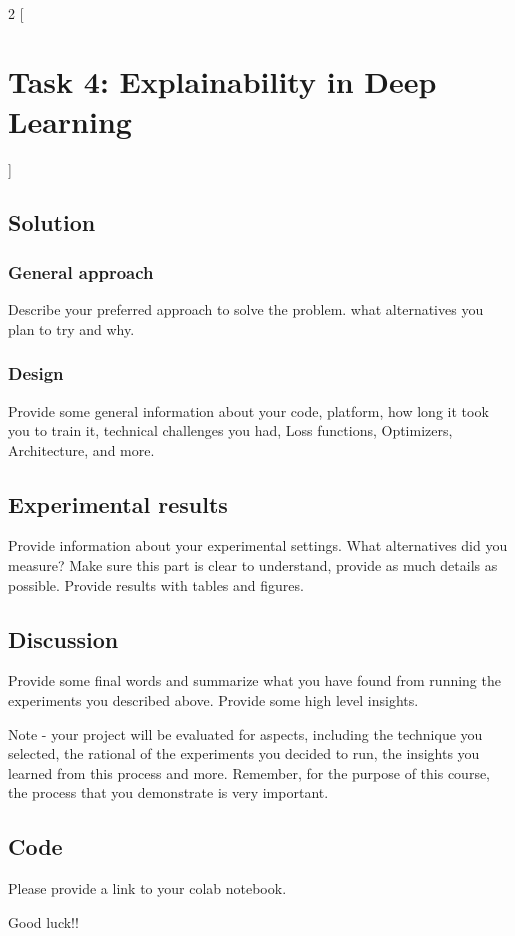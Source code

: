 \documentclass{article}
\begin{document}
\
\begin{multicols}{2}
[
\section{\centering Task 4: Explainability in Deep Learning}
]
\subsection{Solution}
\subsubsection{General approach}
Describe your preferred approach to solve the problem. what alternatives you plan to try and why. 

\subsubsection{Design}
Provide some general information about your code, platform, how long it took you to train it, technical challenges you had, Loss functions, Optimizers, Architecture, and more.

\subsection{Experimental results}
Provide information about your experimental settings. What alternatives did you measure? Make sure this part is clear to understand, provide as much details as possible. Provide results with tables and figures.

\subsection{Discussion}
Provide some final words and summarize what you have found from running the experiments you described above. Provide some high level insights.

Note - your project will be evaluated for aspects, including the technique you selected, the rational of the experiments you decided to run, the insights you learned from this process and more. Remember, for the purpose of this course, the process that you demonstrate is very  important.

\subsection{Code}

Please provide a link to your colab notebook.

\end{multicols}


Good luck!!


\end{document}
